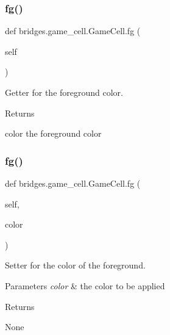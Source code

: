 \subsubsection{\texorpdfstring{fg()}{fg()}\hspace{0.1cm}{\footnotesize\ttfamily [1/2]}}
{\footnotesize\ttfamily def bridges.\+game\+\_\+cell.\+Game\+Cell.\+fg (\begin{DoxyParamCaption}\item[{}]{self }\end{DoxyParamCaption})}



Getter for the foreground color. 

\begin{DoxyReturn}{Returns}


color the foreground color 
\end{DoxyReturn}
\mbox{\label{classbridges_1_1game__cell_1_1_game_cell_ae49f154ef62b58e70c06b6a1da230acc}} 
\subsubsection{\texorpdfstring{fg()}{fg()}\hspace{0.1cm}{\footnotesize\ttfamily [2/2]}}
{\footnotesize\ttfamily def bridges.\+game\+\_\+cell.\+Game\+Cell.\+fg (\begin{DoxyParamCaption}\item[{}]{self,  }\item[{}]{color }\end{DoxyParamCaption})}



Setter for the color of the foreground. 


\begin{DoxyParams}{Parameters}
{\em color} & the color to be applied \\
\hline
\end{DoxyParams}
\begin{DoxyReturn}{Returns}


None 
\end{DoxyReturn}
\mbox{\label{classbridges_1_1game__cell_1_1_game_cell_a5ab6deab003f6c35d7bd8f18d4fecf7b}} 
